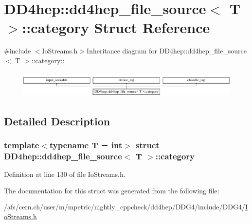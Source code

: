 \hypertarget{struct_d_d4hep_1_1dd4hep__file__source_1_1category}{
\section{DD4hep::dd4hep\_\-file\_\-source$<$ T $>$::category Struct Reference}
\label{struct_d_d4hep_1_1dd4hep__file__source_1_1category}
}


{\ttfamily \#include $<$IoStreams.h$>$}Inheritance diagram for DD4hep::dd4hep\_\-file\_\-source$<$ T $>$::category::\begin{figure}[H]
\begin{center}
\leavevmode
\includegraphics[height=1.37761cm]{struct_d_d4hep_1_1dd4hep__file__source_1_1category}
\end{center}
\end{figure}


\subsection{Detailed Description}
\subsubsection*{template$<$typename T = int$>$ struct DD4hep::dd4hep\_\-file\_\-source$<$ T $>$::category}



Definition at line 130 of file IoStreams.h.

The documentation for this struct was generated from the following file:\begin{DoxyCompactItemize}
\item 
/afs/cern.ch/user/m/mpetric/nightly\_\-cppcheck/dd4hep/DDG4/include/DDG4/\hyperlink{_io_streams_8h}{IoStreams.h}\end{DoxyCompactItemize}
